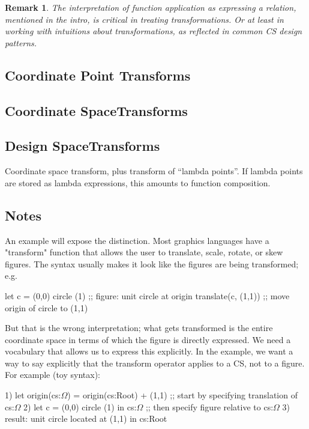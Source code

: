 \documentclass[12pt]{tufte-handout}
\numberwithin{equation}{subsection}
\numberwithin{equation}{subsection}
\newtheorem{remark}{Remark}
\newcommand\Cspace{Coordinate space}
\newcommand\CSpace{Coordinate Space}
\newcommand\DSpace{Design Space}
\begin{document}
  \begin{remark}
    The interpretation of function application as expressing a
    relation, mentioned in the intro, is critical in treating
    transformations.  Or at least in working with intuitions about
    transformations, as reflected in common CS design patterns.
  \end{remark}

  \subsection{Coordinate Point Transforms}

  \subsection{\CSpace Transforms}

  \subsection{\DSpace Transforms}
  \label{subs:}

  \Cspace{} transform, plus transform of ``lambda points''.  If lambda points are stored as lambda expressions, this amounts to function composition.

  \subsection{Notes}

  An example will expose the distinction.  Most graphics languages have
  a "transform" function that allows the user to translate, scale,
  rotate, or skew figures.  The syntax usually makes it look like the
  figures are being transformed; e.g.

  let c = (0,0) circle (1)  ;; figure: unit circle at origin
  translate(c, (1,1))	      ;; move origin of circle to (1,1)

  But that is the wrong interpretation; what gets transformed is the
  entire coordinate space in terms of which the figure is directly
  expressed.  We need a vocabulary that allows us to express this
  explicitly.  In the example, we want a way to say explicitly that the
  transform operator applies to a CS, not to a figure.  For example (toy syntax):

  1)	  let origin(cs:$\Omega$) = origin(cs:Root) + (1,1)  ;; start by specifying translation of cs:$\Omega$
  2)	  let c = (0,0) circle (1) in cs:$\Omega$  ;; then specify figure relative to cs:$\Omega$
  3)	  result: unit circle located at (1,1) in cs:Root
\end{document}
